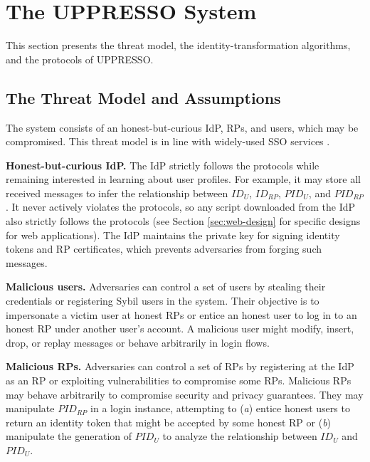\section{The UPPRESSO System}
\label{sec:UPPRESSO}

This section presents the threat model, the identity-transformation algorithms, and the protocols of UPPRESSO.

\subsection{The Threat Model and Assumptions}
\label{subsec:threatmodel}
The system consists of an honest-but-curious IdP, RPs, and users, which may be compromised. %
This threat model is in line with widely-used SSO services \cite{OpenIDConnect,rfc6749, SAML, SAMLIdentifier, NIST2017draft}.

\noindent \textbf{Honest-but-curious IdP.} The IdP strictly follows the protocols while remaining interested in learning about user profiles.
For example, it may store all received messages to infer the relationship between $ID_U$, $ID_{RP}$, $PID_{U}$, and $PID_{RP}$.
It never actively violates the protocols, so any script downloaded from the IdP also strictly follows the protocols (see Section \ref{sec:web-design} for specific designs for web applications). The IdP maintains the private key for signing identity tokens and RP certificates, %
which prevents adversaries from forging such messages.

\noindent \textbf{Malicious users.} Adversaries can control a set of users by stealing their credentials or registering Sybil users in the system. Their objective is to impersonate a victim user at honest RPs or entice an honest user to log in to an honest RP under another user's account.
A malicious user might modify, insert, drop, or replay messages or behave arbitrarily in login flows.

\noindent \textbf{Malicious RPs.}
Adversaries can control a set of RPs by registering at the IdP as an RP or exploiting vulnerabilities to compromise some RPs. Malicious RPs may behave arbitrarily to compromise security and privacy guarantees.
They may manipulate $PID_{RP}$ in a login instance, attempting to (\emph{a}) entice honest users to return an identity token that might be accepted by some honest RP or (\emph{b}) manipulate the generation of $PID_U$ to analyze the relationship between $ID_U$ and $PID_U$.


